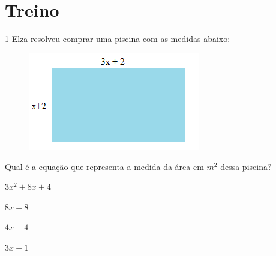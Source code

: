 \section{Treino}

\num{1} Elza resolveu comprar uma piscina com as medidas abaixo:

\begin{figure}[H]
\centering\includegraphics[width=2.9625in,height=1.67014in]{./imgSAEB_8_MAT/media/image6.png}
\end{figure}

Qual é a equação que representa a medida da área em $m^2$ dessa piscina?

\begin{escolha}
\item $3x^2 + $$8x + 4$ 
\item $8x + 8$
\item $4x + 4$
\item $3x + 1$
\end{escolha}













